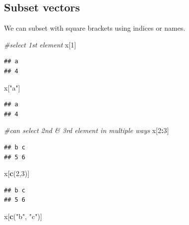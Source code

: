 \documentclass[]{article}
\newenvironment{Shaded}{\begin{snugshade}}{\end{snugshade}}
\newcommand{\KeywordTok}[1]{\textcolor[rgb]{0.13,0.29,0.53}{\textbf{#1}}}
\newcommand{\DecValTok}[1]{\textcolor[rgb]{0.00,0.00,0.81}{#1}}
\newcommand{\StringTok}[1]{\textcolor[rgb]{0.31,0.60,0.02}{#1}}
\newcommand{\CommentTok}[1]{\textcolor[rgb]{0.56,0.35,0.01}{\textit{#1}}}
\newcommand{\OperatorTok}[1]{\textcolor[rgb]{0.81,0.36,0.00}{\textbf{#1}}}
\newcommand{\NormalTok}[1]{#1}
\begin{document}
\subsection{Subset vectors}\label{subset-vectors}

We can subset with square brackets using indices or names.

\begin{Shaded}
\begin{Highlighting}[]
\CommentTok{#select 1st element}
\NormalTok{x[}\DecValTok{1}\NormalTok{]}
\end{Highlighting}
\end{Shaded}

\begin{verbatim}
## a 
## 4
\end{verbatim}

\begin{Shaded}
\begin{Highlighting}[]
\NormalTok{x[}\StringTok{"a"}\NormalTok{]}
\end{Highlighting}
\end{Shaded}

\begin{verbatim}
## a 
## 4
\end{verbatim}

\begin{Shaded}
\begin{Highlighting}[]
\CommentTok{#can select 2nd & 3rd element in multiple ways}
\NormalTok{x[}\DecValTok{2}\OperatorTok{:}\DecValTok{3}\NormalTok{]}
\end{Highlighting}
\end{Shaded}

\begin{verbatim}
## b c 
## 5 6
\end{verbatim}

\begin{Shaded}
\begin{Highlighting}[]
\NormalTok{x[}\KeywordTok{c}\NormalTok{(}\DecValTok{2}\NormalTok{,}\DecValTok{3}\NormalTok{)]}
\end{Highlighting}
\end{Shaded}

\begin{verbatim}
## b c 
## 5 6
\end{verbatim}

\begin{Shaded}
\begin{Highlighting}[]
\NormalTok{x[}\KeywordTok{c}\NormalTok{(}\StringTok{"b"}\NormalTok{, }\StringTok{"c"}\NormalTok{)]}
\end{Highlighting}
\end{Shaded}
\end{document}
